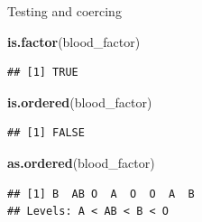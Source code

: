 \documentclass[ignorenonframetext,]{beamer}
\newenvironment{Shaded}{\begin{snugshade}}{\end{snugshade}}
\newcommand{\KeywordTok}[1]{\textcolor[rgb]{0.13,0.29,0.53}{\textbf{#1}}}
\newcommand{\NormalTok}[1]{#1}
\begin{document}
\begin{frame}[fragile]{Testing and coercing}
\protect\hypertarget{testing-and-coercing}{}

\begin{Shaded}
\begin{Highlighting}[]
\KeywordTok{is.factor}\NormalTok{(blood_factor)}
\end{Highlighting}
\end{Shaded}

\begin{verbatim}
## [1] TRUE
\end{verbatim}

\begin{Shaded}
\begin{Highlighting}[]
\KeywordTok{is.ordered}\NormalTok{(blood_factor)}
\end{Highlighting}
\end{Shaded}

\begin{verbatim}
## [1] FALSE
\end{verbatim}

\begin{Shaded}
\begin{Highlighting}[]
\KeywordTok{as.ordered}\NormalTok{(blood_factor)}
\end{Highlighting}
\end{Shaded}

\begin{verbatim}
## [1] B  AB O  A  O  O  A  B 
## Levels: A < AB < B < O
\end{verbatim}

\end{frame}
\end{document}
